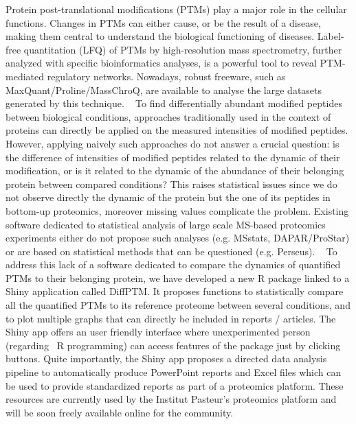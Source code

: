 {Protein post-translational modifications (PTMs) play a major role in the cellular functions. Changes in PTMs can either cause, or be the result of a disease, making them central to understand the biological functioning of diseases. Label-free quantitation (LFQ) of PTMs by high-resolution mass spectrometry, further analyzed with specific bioinformatics analyses, is a powerful tool to reveal PTM-mediated regulatory networks. Nowadays, robust freeware, such as MaxQuant/Proline/MassChroQ, are available to analyse the large datasets generated by this technique.
 
To find differentially abundant modified peptides between biological conditions, approaches traditionally used in the context of proteins can directly be applied on the measured intensities of modified peptides. However, applying naively such approaches do not answer a crucial question: is the difference of intensities of modified peptides related to the dynamic of their modification, or is it related to the dynamic of the abundance of their belonging protein between compared conditions? This raises statistical issues since we do not observe directly the dynamic of the protein but the one of its peptides in bottom-up proteomics, moreover missing values complicate the problem. Existing software dedicated to statistical analysis of large scale MS-based proteomics experiments either do not propose such analyses (e.g. MSstats, DAPAR/ProStar) or are based on statistical methods that can be questioned (e.g. Perseus).
 
To address this lack of a software dedicated to compare the dynamics of quantified PTMs to their belonging protein, we have developed a new R package linked to a Shiny application called DiffPTM. It proposes functions to statistically compare all the quantified PTMs to its reference proteome between several conditions, and to plot multiple graphs that can directly be included in reports / articles. The Shiny app offers an user friendly interface where unexperimented person (regarding  R programming) can access features of the package just by clicking buttons. Quite importantly, the Shiny app proposes a directed data analysis pipeline to automatically produce PowerPoint reports and Excel files which can be used to provide standardized reports as part of a proteomics platform. These resources are currently used by the Institut Pasteur's proteomics platform and will be soon freely available online for the community.


}

